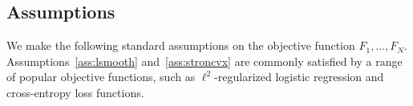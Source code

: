 
\subsection{Assumptions}
\label{sec:assumptions}
We make the following standard assumptions on the objective function $F_1,\dots, F_N$. Assumptions~\ref{ass:lsmooth} and~\ref{ass:stroncvx} are commonly satisfied by a range of popular objective functions, such as $\ell^{2}$-regularized logistic regression and cross-entropy loss functions.


